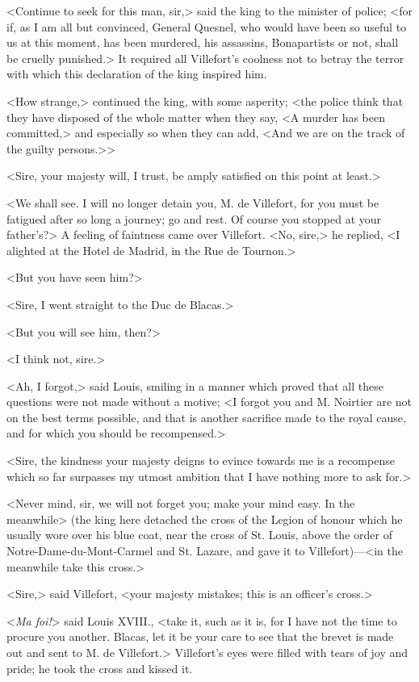  <Continue to seek for this man, sir,> said the king to the minister of police; <for if, as I am all but convinced, General Quesnel, who would have been so useful to us at this moment, has been murdered, his assassins, Bonapartists or not, shall be cruelly punished.> It required all Villefort's coolness not to betray the terror with which this declaration of the king inspired him. 

 <How strange,> continued the king, with some asperity; <the police think that they have disposed of the whole matter when they say, <A murder has been committed,> and especially so when they can add, <And we are on the track of the guilty persons.>> 

 <Sire, your majesty will, I trust, be amply satisfied on this point at least.> 

 <We shall see. I will no longer detain you, M. de Villefort, for you must be fatigued after so long a journey; go and rest. Of course you stopped at your father's?> A feeling of faintness came over Villefort.  <No, sire,> he replied, <I alighted at the Hotel de Madrid, in the Rue de Tournon.> 

 <But you have seen him?> 

 <Sire, I went straight to the Duc de Blacas.> 

 <But you will see him, then?> 

 <I think not, sire.> 

 <Ah, I forgot,> said Louis, smiling in a manner which proved that all these questions were not made without a motive; <I forgot you and M. Noirtier are not on the best terms possible, and that is another sacrifice made to the royal cause, and for which you should be recompensed.> 

 <Sire, the kindness your majesty deigns to evince towards me is a recompense which so far surpasses my utmost ambition that I have nothing more to ask for.> 

 <Never mind, sir, we will not forget you; make your mind easy. In the meanwhile> (the king here detached the cross of the Legion of honour which he usually wore over his blue coat, near the cross of St. Louis, above the order of Notre-Dame-du-Mont-Carmel and St. Lazare, and gave it to Villefort)—<in the meanwhile take this cross.> 

 <Sire,> said Villefort, <your majesty mistakes; this is an officer's cross.> 

 <\textit{Ma foi!}> said Louis XVIII., <take it, such as it is, for I have not the time to procure you another. Blacas, let it be your care to see that the brevet is made out and sent to M. de Villefort.> Villefort's eyes were filled with tears of joy and pride; he took the cross and kissed it. 

